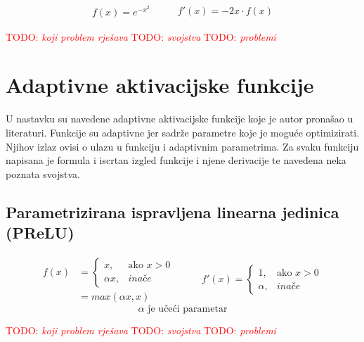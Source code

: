 \documentclass[times, utf8, numeric, diplomski]{fer}
\def\otherwise{\textit{inače}}
\def\TODO#1{\noindent\textcolor{red}{TODO: \textit{#1}}\newline}
\def\todo#1{\TODO{#1}}
\def\todoimg#1{\begin{center} \textcolor{red}{\big[ IMAGE: \textit{#1} \big]} \end{center}}
\begin{document}
\begin{equation}
\label{eq:gauss}
\begin{split}
f(x) = e^{-x^2}
\end{split}
\qquad
\begin{split}
f'(x) = -2x \cdot f(x)
\end{split}
\end{equation}

\todo{koji problem rješava}
\todo{svojstva}
\todo{problemi}

\iffalse %
\section{Adaptivne aktivacijske funkcije}
U nastavku su navedene adaptivne aktivacijske funkcije koje je autor pronašao u literaturi. Funkcije su adaptivne jer sadrže parametre koje je moguće optimizirati. Njihov izlaz ovisi o ulazu u funkciju i adaptivnim parametrima. Za svaku funkciju napisana je formula i iscrtan izgled funkcije i njene derivacije te navedena neka poznata svojstva.

\subsection{Parametrizirana ispravljena linearna jedinica (PReLU)}

\todoimg{}

\begin{equation}
\begin{split}
f(x) &= \begin{cases}
x,			& \text{ako } x > 0 \\
\alpha x,	& \otherwise
\end{cases} \\
&= max(\alpha x, x)
\end{split}
\qquad
\begin{split}
f'(x) = 
\begin{cases}
1,		& \text{ako } x > 0 \\
\alpha,	& \otherwise
\end{cases}
\end{split}
\end{equation}
\begin{equation*}
\alpha \text{ je učeći parametar}
\end{equation*}

\todo{koji problem rješava}
\todo{svojstva}
\todo{problemi}
\end{document}
